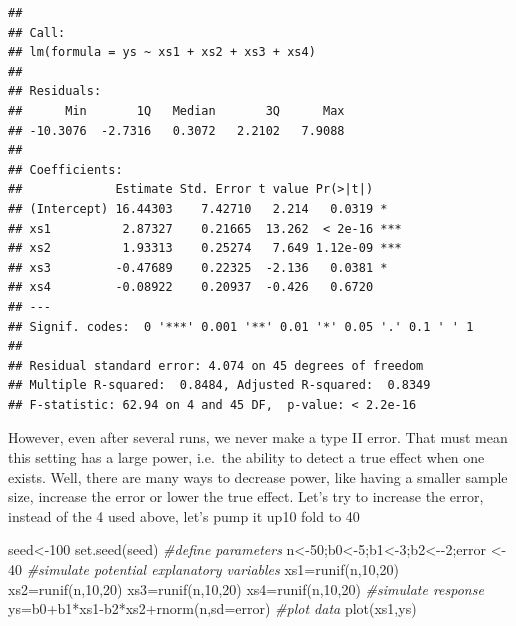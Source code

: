 \documentclass[
]{book}
\newenvironment{Shaded}{\begin{snugshade}}{\end{snugshade}}
\newcommand{\AttributeTok}[1]{\textcolor[rgb]{0.77,0.63,0.00}{#1}}
\newcommand{\CommentTok}[1]{\textcolor[rgb]{0.56,0.35,0.01}{\textit{#1}}}
\newcommand{\DecValTok}[1]{\textcolor[rgb]{0.00,0.00,0.81}{#1}}
\newcommand{\FunctionTok}[1]{\textcolor[rgb]{0.00,0.00,0.00}{#1}}
\newcommand{\NormalTok}[1]{#1}
\newcommand{\OtherTok}[1]{\textcolor[rgb]{0.56,0.35,0.01}{#1}}
\newcommand{\SpecialCharTok}[1]{\textcolor[rgb]{0.00,0.00,0.00}{#1}}
\begin{document}
\begin{verbatim}
## 
## Call:
## lm(formula = ys ~ xs1 + xs2 + xs3 + xs4)
## 
## Residuals:
##      Min       1Q   Median       3Q      Max 
## -10.3076  -2.7316   0.3072   2.2102   7.9088 
## 
## Coefficients:
##             Estimate Std. Error t value Pr(>|t|)    
## (Intercept) 16.44303    7.42710   2.214   0.0319 *  
## xs1          2.87327    0.21665  13.262  < 2e-16 ***
## xs2          1.93313    0.25274   7.649 1.12e-09 ***
## xs3         -0.47689    0.22325  -2.136   0.0381 *  
## xs4         -0.08922    0.20937  -0.426   0.6720    
## ---
## Signif. codes:  0 '***' 0.001 '**' 0.01 '*' 0.05 '.' 0.1 ' ' 1
## 
## Residual standard error: 4.074 on 45 degrees of freedom
## Multiple R-squared:  0.8484, Adjusted R-squared:  0.8349 
## F-statistic: 62.94 on 4 and 45 DF,  p-value: < 2.2e-16
\end{verbatim}

However, even after several runs, we never make a type II error. That must mean this setting has a large power, i.e.~the ability to detect a true effect when one exists. Well, there are many ways to decrease power, like having a smaller sample size, increase the error or lower the true effect. Let's try to increase the error, instead of the 4 used above, let's pump it up10 fold to 40

\begin{Shaded}
\begin{Highlighting}[]
\NormalTok{seed}\OtherTok{\textless{}{-}}\DecValTok{100}
\FunctionTok{set.seed}\NormalTok{(seed)}
\CommentTok{\#define parameters}
\NormalTok{n}\OtherTok{\textless{}{-}}\DecValTok{50}\NormalTok{;b0}\OtherTok{\textless{}{-}}\DecValTok{5}\NormalTok{;b1}\OtherTok{\textless{}{-}}\DecValTok{3}\NormalTok{;b2}\OtherTok{\textless{}{-}}\SpecialCharTok{{-}}\DecValTok{2}\NormalTok{;error }\OtherTok{\textless{}{-}} \DecValTok{40}
\CommentTok{\#simulate potential explanatory variables}
\NormalTok{xs1}\OtherTok{=}\FunctionTok{runif}\NormalTok{(n,}\DecValTok{10}\NormalTok{,}\DecValTok{20}\NormalTok{)}
\NormalTok{xs2}\OtherTok{=}\FunctionTok{runif}\NormalTok{(n,}\DecValTok{10}\NormalTok{,}\DecValTok{20}\NormalTok{)}
\NormalTok{xs3}\OtherTok{=}\FunctionTok{runif}\NormalTok{(n,}\DecValTok{10}\NormalTok{,}\DecValTok{20}\NormalTok{)}
\NormalTok{xs4}\OtherTok{=}\FunctionTok{runif}\NormalTok{(n,}\DecValTok{10}\NormalTok{,}\DecValTok{20}\NormalTok{)}
\CommentTok{\#simulate response}
\NormalTok{ys}\OtherTok{=}\NormalTok{b0}\SpecialCharTok{+}\NormalTok{b1}\SpecialCharTok{*}\NormalTok{xs1}\SpecialCharTok{{-}}\NormalTok{b2}\SpecialCharTok{*}\NormalTok{xs2}\SpecialCharTok{+}\FunctionTok{rnorm}\NormalTok{(n,}\AttributeTok{sd=}\NormalTok{error)}
\CommentTok{\#plot data}
\FunctionTok{plot}\NormalTok{(xs1,ys)}
\end{Highlighting}
\end{Shaded}
\end{document}
